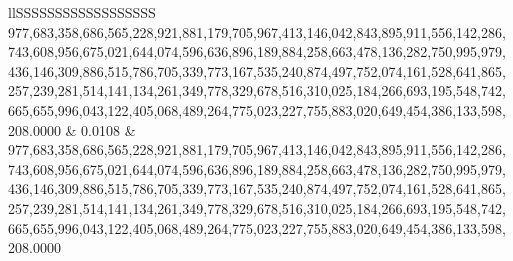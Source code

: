 \begin{table}
\begin{tabular}{llSSSSSSSSSSSSSSSSSS}
977,683,358,686,565,228,921,881,179,705,967,413,146,042,843,895,911,556,142,286,743,608,956,675,021,644,074,596,636,896,189,884,258,663,478,136,282,750,995,979,436,146,309,886,515,786,705,339,773,167,535,240,874,497,752,074,161,528,641,865,257,239,281,514,141,134,261,349,778,329,678,516,310,025,184,266,693,195,548,742,665,655,996,043,122,405,068,489,264,775,023,227,755,883,020,649,454,386,133,598,208.0000 & 0.0108           & 977,683,358,686,565,228,921,881,179,705,967,413,146,042,843,895,911,556,142,286,743,608,956,675,021,644,074,596,636,896,189,884,258,663,478,136,282,750,995,979,436,146,309,886,515,786,705,339,773,167,535,240,874,497,752,074,161,528,641,865,257,239,281,514,141,134,261,349,778,329,678,516,310,025,184,266,693,195,548,742,665,655,996,043,122,405,068,489,264,775,023,227,755,883,020,649,454,386,133,598,208.0000 \\

\end{tabular}
\end{table}
